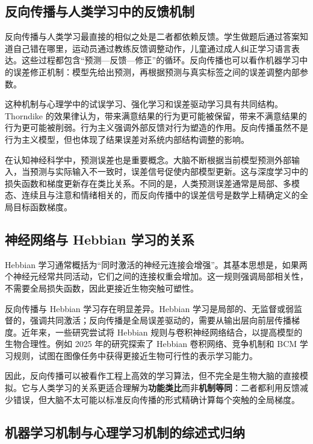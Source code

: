\documentclass[UTF8,zihao=-4,a4paper]{ctexart}
\begin{document}
\subsection{反向传播与人类学习中的反馈机制}

反向传播与人类学习最直接的相似之处是二者都依赖反馈。学生做题后通过答案知道自己错在哪里，运动员通过教练反馈调整动作，儿童通过成人纠正学习语言表达。这些过程都包含“预测—反馈—修正”的循环。反向传播也可以看作机器学习中的误差修正机制：模型先给出预测，再根据预测与真实标签之间的误差调整内部参数。

这种机制与心理学中的试误学习、强化学习和误差驱动学习具有共同结构。Thorndike 的效果律认为，带来满意结果的行为更可能被保留，带来不满意结果的行为更可能被削弱。行为主义强调外部反馈对行为塑造的作用。反向传播虽然不是行为主义模型，但也体现了结果误差对系统内部结构调整的影响。

在认知神经科学中，预测误差也是重要概念。大脑不断根据当前模型预测外部输入，当预测与实际输入不一致时，误差信号促使内部模型更新。这与深度学习中的损失函数和梯度更新存在类比关系。不同的是，人类预测误差通常是局部、多模态、连续且与注意和情绪相关的，而反向传播中的误差信号是数学上精确定义的全局目标函数梯度。

\subsection{神经网络与 Hebbian 学习的关系}

Hebbian 学习通常概括为“同时激活的神经元连接会增强”。其基本思想是，如果两个神经元经常共同活动，它们之间的连接权重会增加。这一规则强调局部相关性，不需要全局损失函数，因此更接近生物突触可塑性。

反向传播与 Hebbian 学习存在明显差异。Hebbian 学习是局部的、无监督或弱监督的，强调共同激活；反向传播是全局误差驱动的，需要从输出层向前层传播梯度。近年来，一些研究尝试将 Hebbian 规则与卷积神经网络结合，以提高模型的生物合理性。例如 2025 年的研究探索了 Hebbian 卷积网络、竞争机制和 BCM 学习规则，试图在图像任务中获得更接近生物可行性的表示学习能力\cite{nimmo2025hebbian}。

因此，反向传播可以被看作工程上高效的学习算法，但不完全是生物大脑的直接模拟。它与人类学习的关系更适合理解为\textbf{功能类比}而非\textbf{机制等同}：二者都利用反馈减少错误，但大脑不太可能以标准反向传播的形式精确计算每个突触的全局梯度。

\subsection{机器学习机制与心理学习机制的综述式归纳}
\end{document}
